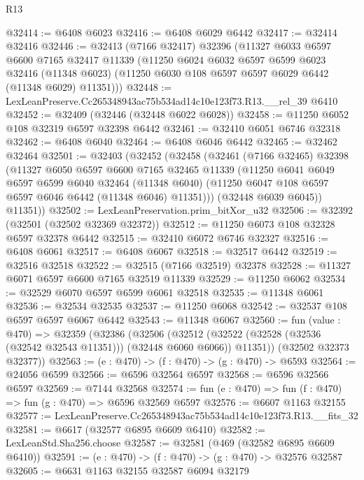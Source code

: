\begin{lexlean}{R13}
\begin{coremodule}
@32414 := @6408 @6023
@32416 := @6408 @6029 @6442
@32417 := @32414 @32416
@32446 := @32413
    (@7166 @32417)
    @32396
    (@11327
      @6033
      @6597
      @6600
      @7165
      @32417
      @11339
      (@11250
        @6024
        @6032
        @6597
        @6599
        @6023
        @32416
        (@11348 @6023)
        (@11250 @6030 @108 @6597 @6597 @6029 @6442 (@11348 @6029) @11351)))
@32448 := LexLeanPreserve.Cc265348943ac75b534ad14c10e123f73.R13.__rel_39 @6410
@32452 := @32409 (@32446 (@32448 @6022 @6028))
@32458 := @11250 @6052 @108 @32319 @6597 @32398 @6442
@32461 := @32410 @6051 @6746 @32318
@32462 := @6408 @6040
@32464 := @6408 @6046 @6442
@32465 := @32462 @32464
@32501 := @32403
    (@32452
      (@32458
        (@32461
          (@7166 @32465)
          @32398
          (@11327
            @6050
            @6597
            @6600
            @7165
            @32465
            @11339
            (@11250
              @6041
              @6049
              @6597
              @6599
              @6040
              @32464
              (@11348 @6040)
              (@11250 @6047 @108 @6597 @6597 @6046 @6442 (@11348 @6046) @11351)))
          (@32448 @6039 @6045))
        @11351))
@32502 := LexLeanPreservation.prim_bitXor_u32
@32506 := @32392 (@32501 (@32502 @32369 @32372))
@32512 := @11250 @6073 @108 @32328 @6597 @32378 @6442
@32515 := @32410 @6072 @6746 @32327
@32516 := @6408 @6061
@32517 := @6408 @6067
@32518 := @32517 @6442
@32519 := @32516 @32518
@32522 := @32515 (@7166 @32519) @32378
@32528 := @11327 @6071 @6597 @6600 @7165 @32519 @11339
@32529 := @11250 @6062
@32534 := @32529 @6070 @6597 @6599 @6061 @32518
@32535 := @11348 @6061
@32536 := @32534 @32535
@32537 := @11250 @6068
@32542 := @32537 @108 @6597 @6597 @6067 @6442
@32543 := @11348 @6067
@32560 := fun (value : @470) =>
  @32359
    (@32386
      (@32506
        (@32512 (@32522 (@32528 (@32536 (@32542 @32543 @11351))) (@32448 @6060 @6066)) @11351))
      (@32502 @32373 @32377))
@32563 := (e : @470) -> (f : @470) -> (g : @470) -> @6593
@32564 := @24056 @6599
@32566 := @6596 @32564 @6597
@32568 := @6596 @32566 @6597
@32569 := @7144 @32568
@32574 := fun (e : @470) => fun (f : @470) => fun (g : @470) => @6596 @32569 @6597
@32576 := @6607 @1163 @32155
@32577 := LexLeanPreserve.Cc265348943ac75b534ad14c10e123f73.R13.__fits_32
@32581 := @6617 (@32577 @6895 @6609 @6410)
@32582 := LexLeanStd.Sha256.choose
@32587 := @32581 (@469 (@32582 @6895 @6609 @6410))
@32591 := (e : @470) -> (f : @470) -> (g : @470) -> @32576 @32587
@32605 := @6631
    @1163
    @32155
    @32587
    @6094
    @32179

\end{coremodule}
\end{lexlean}
